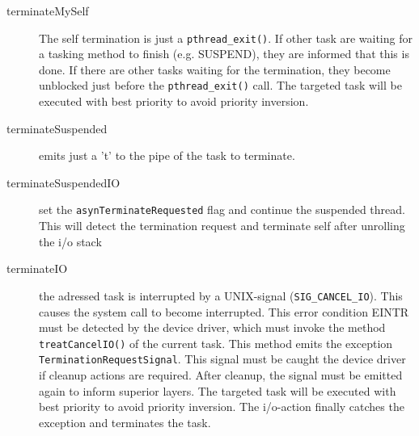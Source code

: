 \begin{description}
\item[terminateMySelf] The self termination is just a \verb|pthread_exit()|.
   If other task are waiting for a tasking method to finish (e.g. SUSPEND),
   they are informed that this is done.
   If there are other tasks waiting for the termination, they become
   unblocked just before the \verb|pthread_exit()| call.
   The targeted task will be executed with best priority to avoid
   priority inversion.
\item[terminateSuspended] emits just a 't' to the pipe of the task 
   to terminate.

\item[terminateSuspendedIO] set the \verb|asynTerminateRequested| flag
   and continue the suspended thread. This will detect the termination
   request and terminate self after unrolling the i/o stack

\item[terminateIO] the adressed task is interrupted by a 
   UNIX-signal (\verb|SIG_CANCEL_IO|). This causes the system
   call to become interrupted. This error condition EINTR must 
   be detected by the device driver, which must invoke the method
   \verb|treatCancelIO()| of the current task. This method emits the 
   exception \verb|TerminationRequestSignal|. This signal must be caught
   the device driver if cleanup actions are required. After cleanup,
   the signal must be emitted again to inform superior layers.
   The targeted task will be executed with best priority to avoid
   priority inversion. 
   The i/o-action finally catches the exception and terminates the task.
\end{description}

